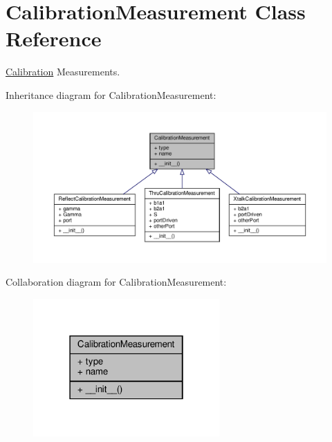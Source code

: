 \hypertarget{classSignalIntegrity_1_1Measurement_1_1Calibration_1_1CalibrationMeasurements_1_1CalibrationMeasurement}{}\section{Calibration\+Measurement Class Reference}
\label{classSignalIntegrity_1_1Measurement_1_1Calibration_1_1CalibrationMeasurements_1_1CalibrationMeasurement}


\hyperlink{namespaceSignalIntegrity_1_1Measurement_1_1Calibration_1_1Calibration}{Calibration} Measurements.  




Inheritance diagram for Calibration\+Measurement\+:\nopagebreak
\begin{figure}[H]
\begin{center}
\leavevmode
\includegraphics[width=350pt]{classSignalIntegrity_1_1Measurement_1_1Calibration_1_1CalibrationMeasurements_1_1CalibrationMeasurement__inherit__graph}
\end{center}
\end{figure}


Collaboration diagram for Calibration\+Measurement\+:\nopagebreak
\begin{figure}[H]
\begin{center}
\leavevmode
\includegraphics[width=202pt]{classSignalIntegrity_1_1Measurement_1_1Calibration_1_1CalibrationMeasurements_1_1CalibrationMeasurement__coll__graph}
\end{center}
\end{figure}
